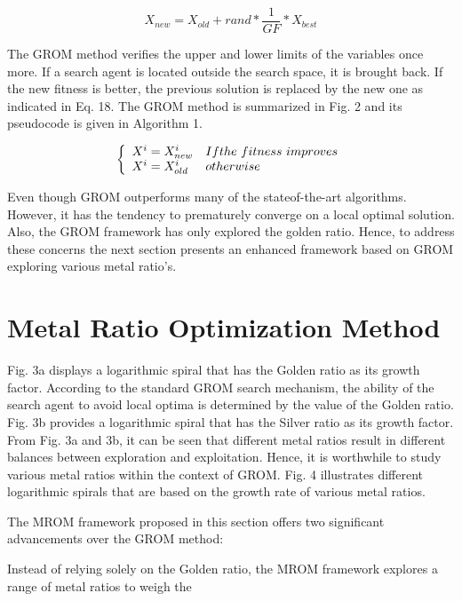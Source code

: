 \begin{equation}
X_{n e w}=X_{o l d}+r a n d*\frac{1}{G F}*X_{b e s t}
\end{equation}

The GROM method verifies the upper and lower limits of the variables once more. If a search agent is located outside the search space, it is brought back. If the new fitness is better, the previous solution is replaced by the new one as indicated in Eq. 18. The GROM method is summarized in Fig. 2 and its pseudocode is given in Algorithm 1.

\begin{equation}
\left\{\begin{array}{l l}{X^{i}=X_{n e w}^{i}}&{I f t h e\ f i t n e s s\ i m p r o v e s}\\ {X^{i}=X_{o l d}^{i}}&{o t h e r w i s e}\end{array}\right.
\end{equation}

Even though GROM outperforms many of the stateof-the-art algorithms. However, it has the tendency to prematurely converge on a local optimal solution. Also, the GROM framework has only explored the golden ratio. Hence, to address these concerns the next section presents an enhanced framework based on GROM exploring various metal ratio’s.

\section{Metal Ratio Optimization Method}

Fig. 3a displays a logarithmic spiral that has the Golden ratio as its growth factor. According to the standard GROM search mechanism, the ability of the search agent to avoid local optima is determined by the value of the Golden ratio. Fig. 3b provides a logarithmic spiral that has the Silver ratio as its growth factor. From Fig. 3a and 3b, it can be seen that different metal ratios result in different balances between exploration and exploitation. Hence, it is worthwhile to study various metal ratios within the context of GROM. Fig. 4 illustrates different logarithmic spirals that are based on the growth rate of various metal ratios.

The MROM framework proposed in this section offers two significant advancements over the GROM method:

Instead of relying solely on the Golden ratio, the MROM framework explores a range of metal ratios to weigh the

